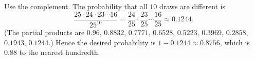 Use the complement. The probability that all $10$ draws are different is
\[
\dfrac{25\cdot24\cdot23\cdots16}{25^{10}}=\dfrac{24}{25}\cdot\dfrac{23}{25}\cdots\dfrac{16}{25}\approx0.1244 .
\]
(The partial products are $0.96$, $0.8832$, $0.7771$, $0.6528$, $0.5223$, $0.3969$, $0.2858$, $0.1943$, $0.1244$.) Hence the desired probability is $1-0.1244\approx0.8756$, which is $\boxed{0.88}$ to the nearest hundredth.

